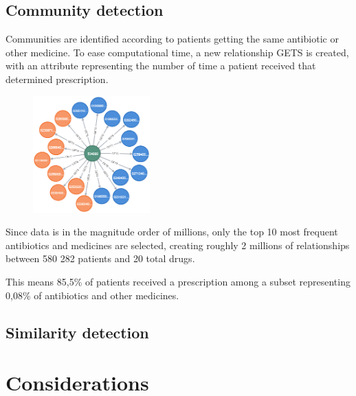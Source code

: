 \subsection{Community detection}

Communities are identified according to patients getting the same antibiotic or other medicine. To ease computational time, a new relationship GETS is created, with an attribute representing the number of time a patient received that determined prescription.

 \begin{figure}
	\vspace{-10pt}
	\includegraphics[width=0.4\textwidth]{./images/patient-gets-graph.png}
	\vspace{-30pt}
\end{figure}

Since data is in the magnitude order of millions, only the top 10 most frequent antibiotics and medicines are selected, creating roughly 2 millions of relationships between 580 282 patients and 20 total drugs.

This means 85,5\% of patients received a prescription among a subset representing 0,08\% of antibiotics and other medicines.

\subsection{Similarity detection}


\section{Considerations}







